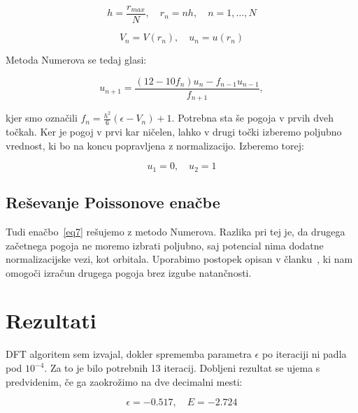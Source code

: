 \documentclass[a4paper]{article}
\begin{document}
    \begin{equation}\label{eq12}
        h = \frac{r_{max}}{N}, \quad r_n = nh, \quad n = 1, \ldots, N
    \end{equation}

    \begin{equation}\label{eq13}
        V_n = V(r_n), \quad u_n = u(r_n)
    \end{equation}

    Metoda Numerova se tedaj glasi:

    \begin{equation}\label{eq14}
        u_{n+1} = \frac{(12 - 10f_n)u_n - f_{n-1}u_{n-1}}{f_{n+1}},
    \end{equation}

    kjer smo označili $f_n = \frac{h^2}{6} (\epsilon - V_n) + 1$.
    Potrebna sta še pogoja v prvih dveh točkah.
    Ker je pogoj v prvi kar ničelen, lahko v drugi točki izberemo poljubno vrednost, ki bo na koncu popravljena z
    normalizacijo.
    Izberemo torej:

    \begin{equation}\label{eq15}
        u_1 = 0, \quad u_2 = 1
    \end{equation}

    \subsection{Reševanje Poissonove enačbe}

    Tudi enačbo~\ref{eq7} rešujemo z metodo Numerova.
    Razlika pri tej je, da drugega začetnega pogoja ne moremo izbrati poljubno, saj potencial nima dodatne
    normalizacijske vezi, kot orbitala.
    Uporabimo postopek opisan v članku~\cite{it1}, ki nam omogoči izračun drugega pogoja brez izgube natančnosti.

    \section{Rezultati}

    DFT algoritem sem izvajal, dokler sprememba parametra $\epsilon$ po iteraciji ni padla pod $10^{-4}$.
    Za to je bilo potrebnih 13 iteracij.
    Dobljeni rezultat se ujema s predvidenim, če ga zaokrožimo na dve decimalni mesti:

    \begin{equation}\label{eq16}
        \epsilon = - 0.517, \quad E = - 2.724
    \end{equation}
\end{document}
